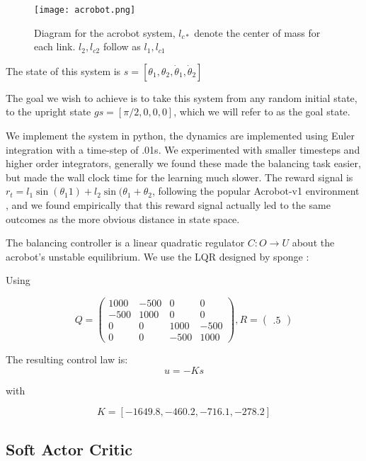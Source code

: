 \documentclass[letterpaper, 10 pt, conference]{ieeeconf}
\begin{document}
\begin{figure}[ht]
\centering
  \texttt{[image: acrobot.png]}
  \caption{Diagram for the acrobot system, $l_{c*}$ denote the center of mass for each link. $l_{2}, l_{c2}$ follow as $l_{1}, l_{c1}$}
  \label{fig:acrobot}
\end{figure}


The state of this system is $s = [\theta_{1}, \theta_{2}, \dot \theta_{1}, \dot \theta_{2}]$

The goal we wish to achieve is to take this system from any random initial state, to the upright state $gs = [\pi/2, 0, 0, 0]$, which we will refer to as the goal state. 

We implement the system in python, the dynamics are implemented using Euler integration with a time-step of .01s. We experimented with smaller timesteps and higher order integrators, generally we found these made the balancing task easier, but made the wall clock time for the learning much slower.  The reward signal is $r_{t} = l_{1}\sin(\theta_1{1}) + l_{2} \sin(\theta_{1} + \theta_{2}$, following the popular Acrobot-v1 environment \cite{baselines}, and we found empirically that this reward signal actually led to the same outcomes as the more obvious distance in state space. 


The balancing controller is a linear quadratic regulator $C: O \rightarrow U$  about the acrobot's unstable equilibrium. We use the LQR designed by sponge \cite{spong_swing_1994}:

Using 

\[ Q = \begin{pmatrix} 1000 & -500 & 0 & 0 \\ -500 & 1000 & 0 & 0 \\ 0 & 0 & 1000 & -500 \\ 0 & 0 & -500 & 1000\end{pmatrix}, R = \begin{pmatrix} .5 \end{pmatrix}
\]

The resulting control law is: 
\[ u = -Ks \]

with 

\[ K = [-1649.8,  -460.2,  -716.1,  -278.2] \] 

\subsection{Soft Actor Critic}

\end{document}
